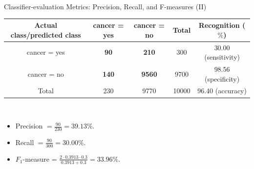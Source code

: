 \begin{frame}{Classifier-evaluation Metrics: Precision, Recall, and F-measures (II)}
	\centering
	\begin{tabular}{|c|c|c|c|c|}
		\hline
		Actual class/predicted class & cancer = yes & cancer = no   & Total & Recognition ($\%$)  \\\hline
		cancer = yes                 & \textbf{90}  & \textbf{210}  & 300   & 30.00 (sensitivity) \\\hline
		cancer = no                  & \textbf{140} & \textbf{9560} & 9700  & 98.56 (specificity) \\\hline
		Total                        & 230          & 9770          & 10000 & 96.40 (accuracy)    \\\hline
	\end{tabular}\\[0.2cm]
	\begin{itemize}
		\item Precision $= \frac{90}{230} = 39.13 \%$.
		\item Recall $=\frac{90}{300} = 30.00 \%$.
		\item $F_1$-measure = $\frac{2 \cdot 0.3913 \cdot 0.3}{0.3913 + 0.3} = 33.96 \%$.
	\end{itemize}
\end{frame}

